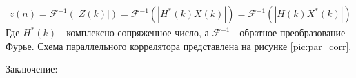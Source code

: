 \documentclass[a4paper,12pt]{article}
\numberwithin{table}{section}
\begin{document}
\begin{eqnarray}
	z(n)	= \mathcal{F}^{-1}(\left|{Z(k)}\right|)
		= \mathcal{F}^{-1}(\left|{H^*(k)X(k)}\right|)
		= \mathcal{F}^{-1}(\left|{H(k)X^*(k)}\right|)
\label{eq:par_corr}
\end{eqnarray}
Где ${H^*(k)}$ - комплексно-сопряженное число, а ${\mathcal{F}^{-1}}$ - обратное преобразование Фурье. Схема параллельного коррелятора
представлена на рисунке \ref{pic:par_corr}.

Заключение:


\end{document}
